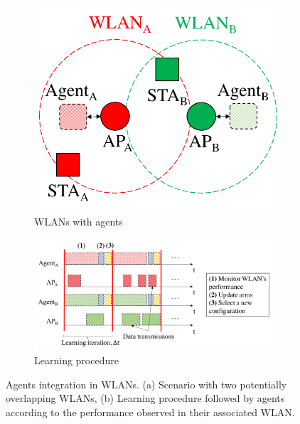 \documentclass{article}
\begin{document}
\begin{figure}[h!]
	\centering		
	\begin{subfigure}[b]{0.35\textwidth}
		\includegraphics[width=\textwidth]{agents_a}
		\caption{WLANs with agents}\label{fig:agents_a}
	\end{subfigure}
	\begin{subfigure}[b]{0.6\textwidth}
		\includegraphics[width=\textwidth]{agents_b}
		\caption{Learning procedure}\label{fig:agents_b}
	\end{subfigure}
	\caption{Agents integration in WLANs. (a) Scenario with two potentially overlapping WLANs, (b) Learning procedure followed by agents according to the performance observed in their associated WLAN.}
	\label{fig:agents}
\end{figure}
\end{document}
